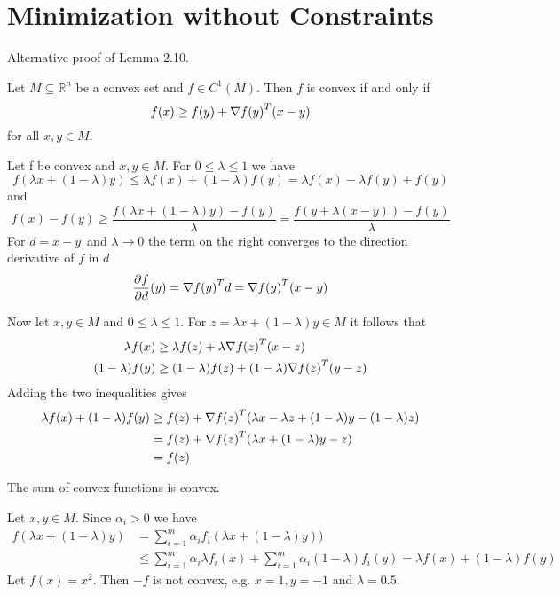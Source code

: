 
\newpage
\section{Minimization without Constraints}

Alternative proof of Lemma 2.10.

\label{thm:lemma_gradient_inequality}
Let \(M \subseteq \mathbb{R}^n \) be a convex set and \(f \in C^1(M)\). Then \(f\) is convex if and only if
\[
    f(x) \ge f(y) + \nabla {f(y)}^T (x - y)
\]  
for all \(x, y \in M \). 

\proof{}
Let f be convex and \(x, y \in M\). For \( 0 \le \lambda \le 1 \) we have
\[ 
    f(\lambda x + (1 - \lambda) y) \le \lambda f(x) + (1 - \lambda)f(y) =  \lambda f(x) - \lambda f(y) + f(y) 
\] 
and 
\[ 
    f(x) - f(y) \ge \frac{f(\lambda x + (1 - \lambda) y) - f(y)}{\lambda}
        = \frac{f(y + \lambda (x - y)) - f(y)}{\lambda}
\]
For \( d = x - y \)\ and \( \lambda \to 0 \) the term on the right converges to the direction derivative of \( f \)
in \( d \)
\[
    \frac{\partial f}{\partial d}(y) = \nabla{f(y)}^T d = \nabla{f(y)}^T (x - y) 
\]

Now let \( x, y \in M \) and  \( 0 \le \lambda \le 1 \). For \( z = \lambda x + (1 - \lambda) y \in M \) it follows that
\[
    \begin{split}
        \lambda f(x) & \ge \lambda f(z) + \lambda \nabla {f(z)}^T (x - z) \\
            (1 - \lambda) f(y) & \ge (1 - \lambda) f(z) + (1 - \lambda) \nabla {f(z)}^T (y - z)
    \end{split}
\]
Adding the two inequalities gives
\[
    \begin{split}
       \lambda f(x) + (1 - \lambda) f(y) 
            & \ge f(z) + \nabla {f(z)}^T(\lambda x - \lambda z + (1- \lambda) y - (1-\lambda)z) \\
            & = f(z) + \nabla {f(z)}^T(\lambda x + (1- \lambda) y - z) \\
            & = f(z)
    \end{split}
\]


The sum of convex functions is convex.

\proof{}
Let \( x, y \in M \). Since \( \alpha_i  > 0 \) we have
\[
    \begin{split}
        f(\lambda x + (1 - \lambda) y) 
            & = \sum_{i=1}^m \alpha_i f_i(\lambda x + (1 - \lambda) y)) \\
            & \le \sum_{i=1}^m \alpha_i \lambda f_i(x) + \sum_{i=1}^m \alpha_i (1 - \lambda) f_i(y) 
                 =  \lambda f(x) + (1 - \lambda) f(y) 
    \end{split}
\]
Let \( f(x) = x^2 \). Then \( -f \) is not convex, e.g. \( x = 1, y = -1 \) and \( \lambda = 0.5 \).


